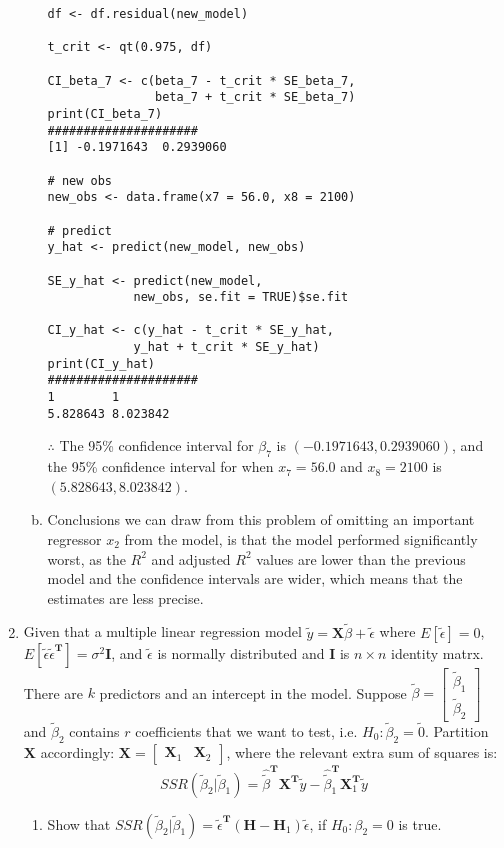 \documentclass[12pt]{article}
\newcommand{\ytilde}{\tilde{y}}
\newcommand{\X}{\mathbf{X}}
\newcommand{\btilde}{\tilde{\beta}}
\newcommand{\etilde}{\tilde{\epsilon}}
\newcommand{\exE}{E[\etilde]}
\newcommand{\etet}{E[\etilde\etilde^{\T}]}
\newcommand{\I}{\mathbf{I}}
\newcommand{\T}{\mathbf{T}}
\newcommand{\HM}{\mathbf{H}}
\begin{document}
\begin{enumerate}[1.]
\begin{enumerate}[a.]
\begin{verbatim}
df <- df.residual(new_model)

t_crit <- qt(0.975, df)

CI_beta_7 <- c(beta_7 - t_crit * SE_beta_7, 
               beta_7 + t_crit * SE_beta_7)
print(CI_beta_7)
#####################
[1] -0.1971643  0.2939060

# new obs
new_obs <- data.frame(x7 = 56.0, x8 = 2100)

# predict
y_hat <- predict(new_model, new_obs)

SE_y_hat <- predict(new_model, 
            new_obs, se.fit = TRUE)$se.fit

CI_y_hat <- c(y_hat - t_crit * SE_y_hat,
            y_hat + t_crit * SE_y_hat)
print(CI_y_hat)
#####################
1        1 
5.828643 8.023842 
                \end{verbatim}
                $\therefore$ The 95\% confidence interval for $\beta_7$ is $(-0.1971643, 0.2939060)$, 
                and the 95\% confidence interval for when $x_7 = 56.0$ and $x_8 = 2100$ is $(5.828643, 8.023842)$.
                \item Conclusions we can draw from this problem of omitting an important regressor $x_2$ from the model, is that
                the model performed significantly worst, as the $R^2$ and adjusted $R^2$ values are lower than the previous model 
                and the confidence intervals are wider, which means that the estimates are less precise.
            \end{enumerate}
            \item Given that a multiple linear regression model $\ytilde = \X \btilde + \etilde$ where
            $\exE = 0$, $\etet = \sigma^2 \I$, and $\etilde$ is normally distributed and $\I$ is $n \times n$ identity matrx.
            There are $k$ predictors and an intercept in the model. Suppose 
            $\btilde = \begin{bmatrix} \btilde_1 \\ \btilde_2 \end{bmatrix}$ and $\btilde_2$ contains $r$ coefficients that we want to
            test, i.e. $H_0 : \btilde_2 = \tilde{0}$. Partition $\X$ accordingly: $\X = \begin{bmatrix} \X_1 & \X_2 \end{bmatrix}$, where
            the relevant extra sum of squares is:
            \[ SSR(\btilde_2 | \btilde_1) = \hat{\btilde}^\T \X^\T \ytilde - \hat{\btilde}_1^\T \X_1^\T \ytilde \]
            \begin{enumerate}
                \item Show that $SSR(\btilde_2 | \btilde_1) =  \etilde^\T (\HM - \HM_1) \etilde$, if $H_0: \beta_2 = 0$ is true.

\end{enumerate}
\end{enumerate}
\end{document}
